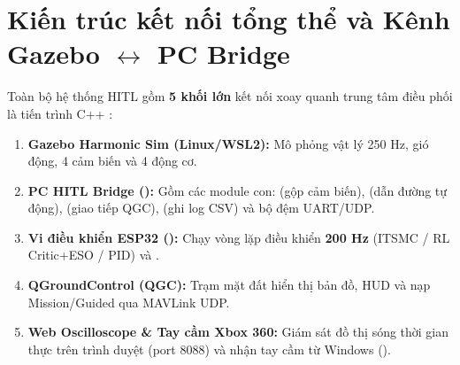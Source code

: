 \documentclass[11pt,a4paper]{article}
\begin{document}
\section{Kiến trúc kết nối tổng thể và Kênh Gazebo $\leftrightarrow$ PC Bridge}

Toàn bộ hệ thống HITL gồm \textbf{5 khối lớn} kết nối xoay quanh trung tâm điều phối là tiến trình C++ :
\begin{enumerate}[leftmargin=1.5em, itemsep=0.2em]
    \item \textbf{Gazebo Harmonic Sim (Linux/WSL2):} Mô phỏng vật lý 250 Hz, gió động, 4 cảm biến và 4 động cơ.
    \item \textbf{PC HITL Bridge ():} Gồm các module con:  (gộp cảm biến),  (dẫn đường tự động),  (giao tiếp QGC),  (ghi log CSV) và bộ đệm UART/UDP.
    \item \textbf{Vi điều khiển ESP32 ():} Chạy vòng lặp điều khiển \textbf{200 Hz} (ITSMC / RL Critic+ESO / PID) và .
    \item \textbf{QGroundControl (QGC):} Trạm mặt đất hiển thị bản đồ, HUD và nạp Mission/Guided qua MAVLink UDP.
    \item \textbf{Web Oscilloscope \& Tay cầm Xbox 360:} Giám sát đồ thị sóng thời gian thực trên trình duyệt (port 8088) và nhận tay cầm từ Windows ().
\end{enumerate}
\end{document}

